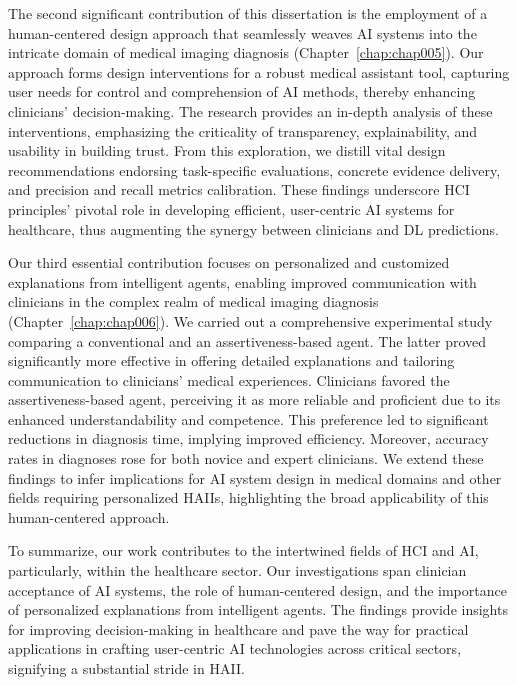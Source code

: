 The second significant contribution of this dissertation is the employment of a human-centered design approach that seamlessly weaves \ac{AI} systems into the intricate domain of medical imaging diagnosis (Chapter~\ref{chap:chap005}).
Our approach forms design interventions for a robust medical assistant tool, capturing user needs for control and comprehension of \ac{AI} methods, thereby enhancing clinicians' decision-making.
The research provides an in-depth analysis of these interventions, emphasizing the criticality of transparency, explainability, and usability in building trust.
From this exploration, we distill vital design recommendations endorsing task-specific evaluations, concrete evidence delivery, and precision and recall metrics calibration.
These findings underscore \ac{HCI} principles' pivotal role in developing efficient, user-centric \ac{AI} systems for healthcare, thus augmenting the synergy between clinicians and \ac{DL} predictions.

Our third essential contribution focuses on personalized and customized explanations from intelligent agents, enabling improved communication with clinicians in the complex realm of medical imaging diagnosis (Chapter~\ref{chap:chap006}).
We carried out a comprehensive experimental study comparing a conventional and an assertiveness-based agent.
The latter proved significantly more effective in offering detailed explanations and tailoring communication to clinicians' medical experiences.
Clinicians favored the assertiveness-based agent, perceiving it as more reliable and proficient due to its enhanced understandability and competence.
This preference led to significant reductions in diagnosis time, implying improved efficiency.
Moreover, accuracy rates in diagnoses rose for both novice and expert clinicians.
We extend these findings to infer implications for \ac{AI} system design in medical domains and other fields requiring personalized \acp{HAII}, highlighting the broad applicability of this human-centered approach.

To summarize, our work contributes to the intertwined fields of \ac{HCI} and \ac{AI}, particularly, within the healthcare sector.
Our investigations span clinician acceptance of \ac{AI} systems, the role of human-centered design, and the importance of personalized explanations from intelligent agents.
The findings provide insights for improving decision-making in healthcare and pave the way for practical applications in crafting user-centric \ac{AI} technologies across critical sectors, signifying a substantial stride in \ac{HAII}.

